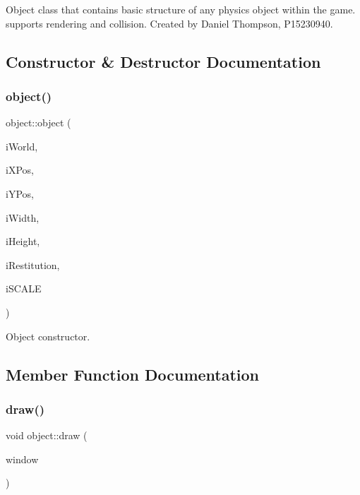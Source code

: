 Object class that contains basic structure of any physics object within the game. supports rendering and collision. Created by Daniel Thompson, P15230940. 

\subsection{Constructor \& Destructor Documentation}
\mbox{\label{classobject_a6444f1addfcba46e8a38e3a10afc5b55}} 
\subsubsection{\texorpdfstring{object()}{object()}}
{\footnotesize\ttfamily object\+::object (\begin{DoxyParamCaption}\item[{b2\+World \&}]{i\+World,  }\item[{float}]{i\+X\+Pos,  }\item[{float}]{i\+Y\+Pos,  }\item[{float}]{i\+Width,  }\item[{float}]{i\+Height,  }\item[{int}]{i\+Restitution,  }\item[{double}]{i\+S\+C\+A\+LE }\end{DoxyParamCaption})}



Object constructor. 



\subsection{Member Function Documentation}
\mbox{\label{classobject_a844b4128957b29e24370efe2d2cb3dca}} 
\subsubsection{\texorpdfstring{draw()}{draw()}}
{\footnotesize\ttfamily void object\+::draw (\begin{DoxyParamCaption}\item[{sf\+::\+Render\+Window \&}]{window }\end{DoxyParamCaption})}



